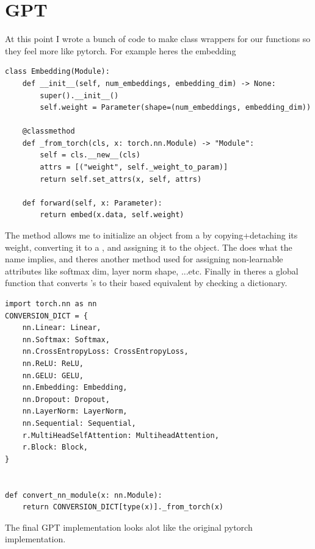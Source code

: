 \documentclass[11pt]{article}
\begin{document}
\section{GPT}
At this point I wrote a bunch of code to make class wrappers for our functions so they feel more like
pytorch. For example heres the embedding
\begin{verbatim}
class Embedding(Module):
    def __init__(self, num_embeddings, embedding_dim) -> None:
        super().__init__()
        self.weight = Parameter(shape=(num_embeddings, embedding_dim))

    @classmethod
    def _from_torch(cls, x: torch.nn.Module) -> "Module":
        self = cls.__new__(cls)
        attrs = [("weight", self._weight_to_param)]
        return self.set_attrs(x, self, attrs)

    def forward(self, x: Parameter):
        return embed(x.data, self.weight)
\end{verbatim}
The  method allows me to initialize an  object from a 
by copying+detaching its weight, converting it to a , and assigning it to the object. The 
 does what the name implies, and theres another method  used for
assigning non-learnable attributes like softmax dim, layer norm shape, ...etc. Finally in theres a global function
 that converts 's to their  based equivalent by checking a 
dictionary. 
\begin{verbatim}
import torch.nn as nn
CONVERSION_DICT = {
    nn.Linear: Linear,
    nn.Softmax: Softmax,
    nn.CrossEntropyLoss: CrossEntropyLoss,
    nn.ReLU: ReLU,
    nn.GELU: GELU,
    nn.Embedding: Embedding,
    nn.Dropout: Dropout,
    nn.LayerNorm: LayerNorm,
    nn.Sequential: Sequential,
    r.MultiHeadSelfAttention: MultiheadAttention,
    r.Block: Block,
}


def convert_nn_module(x: nn.Module):
    return CONVERSION_DICT[type(x)]._from_torch(x)
\end{verbatim}
\par The final GPT implementation
looks alot like the original pytorch implementation.
\end{document}
